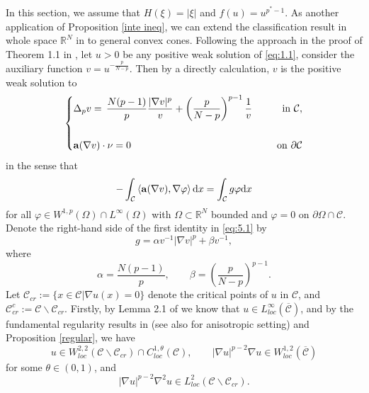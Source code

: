 \documentclass[12pt]{amsart}
\theoremstyle{definition}
\theoremstyle{remark}
\theoremstyle{conclusion}
\theoremstyle{conjecture}
\numberwithin{equation}{section}
\begin{document}
In this section, we assume that $H(\xi)=|\xi|$ and $f(u)=u^{p^*-1}$. As another application of Proposition \ref{inte ineq}, we can extend the classification result in whole space $\mathbb{R}^N$ in \cite{Ou} to general convex cones. Following the approach in the proof of Theorem 1.1 in \cite{Ou}, let $u>0$ be any positive weak solution of \eqref{eq:1.1}, consider the auxiliary function $v=u^{-\frac{p}{N-p}}$. Then by a directly calculation, $v$ is the positive weak solution to
\begin{equation}\label{eq:5.1}
      \left\{
          \begin{aligned}
          &\Delta _{p}v=\, \frac{N(p-1)}{p}\frac{|\nabla v|^p}{v} +\left(\frac{p}{N-p}\right) ^{p-1}\frac{1}{v} \quad\,\,\, &{\rm{in}} \,\, \mathcal{C}, \\ \\
          &{\bf{a}}(\nabla v)\cdot \nu =0 \quad\,\,\, &{\rm{on}} \,\, \partial\mathcal{C}
          \end{aligned}
          \right.
    \end{equation}
in the sense that
\begin{equation}\label{weak v}
  -\int_{\mathcal{C}}\left\langle {\bf{a}}(\nabla v),\nabla\varphi\right\rangle \mathrm{d}x=\int_{\mathcal{C}}g\varphi\mathrm{d}x
\end{equation}
for all $\varphi\in W^{1,p}(\Omega)\cap L^{\infty}(\Omega)$ with $\Omega\subset\mathbb{R}^N$ bounded and $\varphi=0$ on $\partial\Omega\cap\mathcal{C}$.
Denote the right-hand side of the first identity in \eqref{eq:5.1} by
$$g=\alpha v^{-1}|\nabla v|^p +\beta v^{-1},$$
where
\begin{equation}\label{ab}
  \alpha=\frac{N(p-1)}{p},\qquad\beta=\left(\frac{p}{N-p}\right)^{p-1}.
\end{equation}
Let $\mathcal{C}_{cr}:=\{x\in\mathcal{C}| \nabla u(x)=0\}$ denote the critical points of $u$ in $\mathcal{C}$, and $\mathcal{C}^c_{cr}:=\mathcal{C}\backslash\mathcal{C}_{cr}$. Firstly, by Lemma 2.1 of \cite{CFR} we know that $u\in L^{\infty}_{loc}(\overline{\mathcal{C}})$, and by the fundamental regularity results in \cite{AF,Da,Ev,Le,T} (see also \cite{ACF} for anisotropic setting) and Proposition \ref{regular}, we have
\begin{equation*}
  u\in W_{loc}^{2,2}(\mathcal{C}\backslash\mathcal{C}_{cr})\cap C^{1,\theta}_{loc}(\mathcal{C}),\qquad |\nabla u|^{p-2}\nabla u\in W_{loc}^{1,2}(\overline{\mathcal{C}})
\end{equation*}
for some $\theta\in(0,1)$, and
\begin{equation*}
  |\nabla u|^{p-2}\nabla^2 u\in L_{loc}^{2}(\mathcal{C}\backslash\mathcal{C}_{cr}).
\end{equation*}
\end{document}

